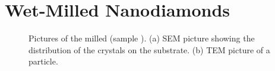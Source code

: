 	\section{Wet-Milled Nanodiamonds}

	\begin{figure}[tp]
		\begin{subfigure}[t]{ 0.49\linewidth}
			\caption{}\label{subfig::sem_milled}
			\centering
		\end{subfigure}
		\hfill
		\begin{subfigure}[t]{ 0.49\linewidth}
			\caption{}\label{subfig::tem_milled}
			\centering
		\end{subfigure}
		\caption{Pictures of the milled \nds (sample \insituH). (a) SEM picture showing the distribution of the \nd crystals on the \ir substrate. (b) TEM picture of a \nd particle.}
		\label{fig::semtem_millled}
	\end{figure}


